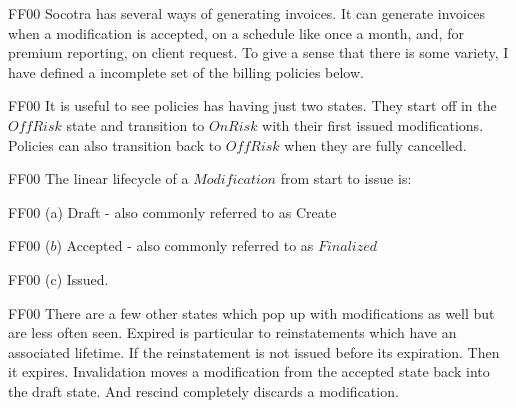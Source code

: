 \tlatex
{}
\@x{}\moduleLeftDash{}\moduleRightDash\@xx{}%
%
\@pvspace{8.0pt}%
%
\@pvspace{8.0pt}%
\begin{lcom}{7.5}%
\begin{cpar}{0}{F}{F}{0}{0}{}%
 Socotra has several ways of generating invoices. It can generate invoices
 when a
 modification is accepted, on a schedule like once a month, and, for premium
 reporting,
 on client request. To give a sense that there is some variety, I have
 defined a
 incomplete set of the billing policies below.
\end{cpar}%
\end{lcom}%
\@pvspace{8.0pt}%
\begin{lcom}{7.5}%
\begin{cpar}{0}{F}{F}{0}{0}{}%
 It is useful to see policies has having just two states. They start off in
 the \ensuremath{OffRisk
 } state and transition to \ensuremath{OnRisk} with their first issued
 modifications. Policies can
 also transition back to \ensuremath{OffRisk} when they are fully cancelled.
\end{cpar}%
\end{lcom}%
%
\@pvspace{8.0pt}%
\begin{lcom}{7.5}%
\begin{cpar}{0}{F}{F}{0}{0}{}%
The linear lifecycle of a \ensuremath{Modification} from start to issue is:
\end{cpar}%
%
\begin{cpar}{0}{F}{F}{0}{0}{}%
(a) Draft - also commonly referred to as Create
\end{cpar}%
%
\begin{cpar}{0}{F}{F}{0}{0}{}%
(\ensuremath{b}) Accepted - also commonly referred to as \ensuremath{Finalized
}%
\end{cpar}%
%
\begin{cpar}{0}{F}{F}{0}{0}{}%
(c) Issued.
\end{cpar}%
%
\begin{cpar}{0}{F}{F}{0}{0}{}%
 There are a few other states which pop up with modifications as well but are
 less often
 seen. Expired is particular to reinstatements which have an associated
 lifetime. If the
 reinstatement is not issued before its expiration. Then it expires.
 Invalidation moves
 a modification from the accepted state back into the draft state. And
 rescind completely
 discards a modification.
\end{cpar}%
\end{lcom}%
